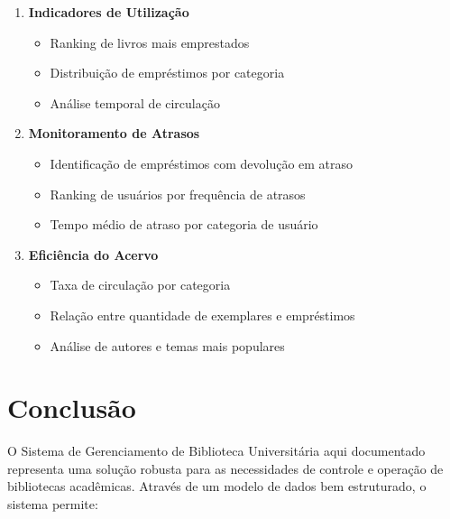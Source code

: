 \documentclass[12pt,a4paper]{article}
\begin{document}
\begin{conceptbox}
\begin{enumerate}[label=\textbf{RA\arabic*.}]
    \item \textbf{Indicadores de Utilização}
    \begin{itemize}
        \item Ranking de livros mais emprestados
        \item Distribuição de empréstimos por categoria
        \item Análise temporal de circulação
    \end{itemize}

    \item \textbf{Monitoramento de Atrasos}
    \begin{itemize}
        \item Identificação de empréstimos com devolução em atraso
        \item Ranking de usuários por frequência de atrasos
        \item Tempo médio de atraso por categoria de usuário
    \end{itemize}

    \item \textbf{Eficiência do Acervo}
    \begin{itemize}
        \item Taxa de circulação por categoria
        \item Relação entre quantidade de exemplares e empréstimos
        \item Análise de autores e temas mais populares
    \end{itemize}
\end{enumerate}
\end{conceptbox}

\section{Conclusão}

O Sistema de Gerenciamento de Biblioteca Universitária aqui documentado representa uma solução robusta para as necessidades de controle e operação de bibliotecas acadêmicas. Através de um modelo de dados bem estruturado, o sistema permite:
\end{document}
